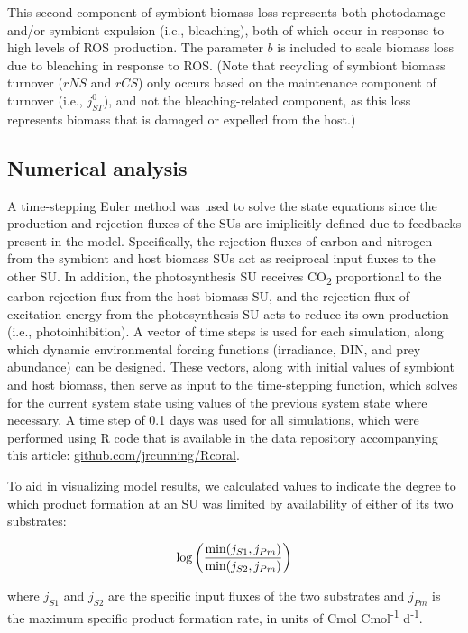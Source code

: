 \documentclass[]{elsarticle} %
\begin{document}
This second component of symbiont biomass loss represents both
photodamage and/or symbiont expulsion (i.e., bleaching), both of which
occur in response to high levels of ROS production. The parameter \(b\)
is included to scale biomass loss due to bleaching in response to ROS.
(Note that recycling of symbiont biomass turnover (\(rNS\) and \(rCS\))
only occurs based on the maintenance component of turnover (i.e.,
\(j_{ST}^0\)), and not the bleaching-related component, as this loss
represents biomass that is damaged or expelled from the host.)

\subsection{Numerical analysis}\label{numerical-analysis}

A time-stepping Euler method was used to solve the state equations since
the production and rejection fluxes of the SUs are imiplicitly defined
due to feedbacks present in the model. Specifically, the rejection
fluxes of carbon and nitrogen from the symbiont and host biomass SUs act
as reciprocal input fluxes to the other SU. In addition, the
photosynthesis SU receives CO\textsubscript{2} proportional to the
carbon rejection flux from the host biomass SU, and the rejection flux
of excitation energy from the photosynthesis SU acts to reduce its own
production (i.e., photoinhibition). A vector of time steps is used for
each simulation, along which dynamic environmental forcing functions
(irradiance, DIN, and prey abundance) can be designed. These vectors,
along with initial values of symbiont and host biomass, then serve as
input to the time-stepping function, which solves for the current system
state using values of the previous system state where necessary. A time
step of 0.1 days was used for all simulations, which were performed
using R code that is available in the data repository accompanying this
article: \url{github.com/jrcunning/Rcoral}.

To aid in visualizing model results, we calculated values to indicate
the degree to which product formation at an SU was limited by
availability of either of its two substrates:

\begin{equation} \log \bigg({{\min(j_{S1}, j_{Pm})} \over {\min(j_{S2}, j_{Pm})}}\bigg) \end{equation}

where \(j_{S1}\) and \(j_{S2}\) are the specific input fluxes of the two
substrates and \(j_{Pm}\) is the maximum specific product formation
rate, in units of Cmol Cmol\textsuperscript{-1} d\textsuperscript{-1}.
\end{document}
